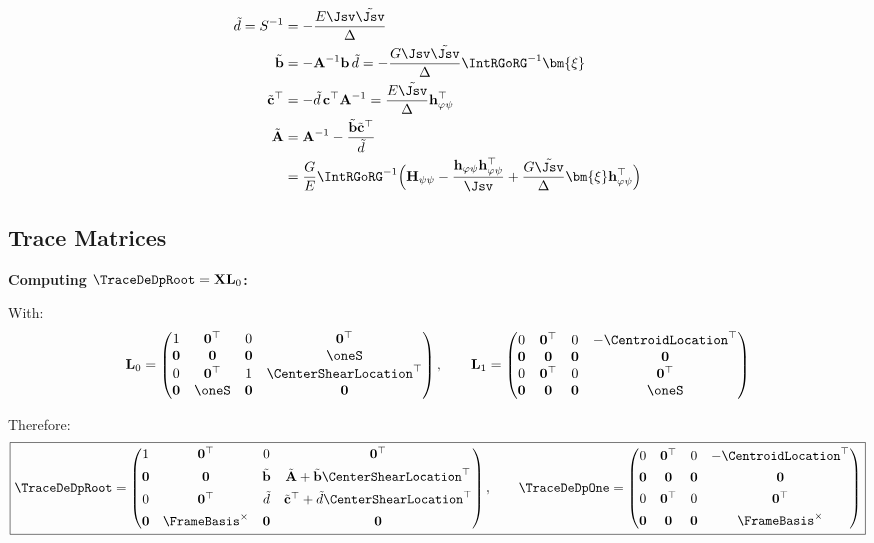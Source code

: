 \[
\begin{aligned}
\tilde{d} = S^{-1} &= -\frac{E\Jsv\tilde{\Jsv}}{\Delta}\\
\tilde{\mathbf{b}} &= -\mathbf{A}^{-1}\mathbf{b}\,\tilde{d} = -\frac{G\Jsv\tilde{\Jsv}}{\Delta}\IntRGoRG^{-1}\bm{\xi} \\
\tilde{\mathbf{c}}^\top &= -\tilde{d}\,\mathbf{c}^\top\mathbf{A}^{-1} = \frac{E\tilde{\Jsv}}{\Delta}\mathbf{h}_{\varphi\psi}^\top \\
\tilde{\mathbf{A}} &= \mathbf{A}^{-1} - \frac{\tilde{\mathbf{b}}\tilde{\mathbf{c}}^\top}{\tilde{d}} \\
&= \frac{G}{E}\IntRGoRG^{-1}\Big(\mathbf{H}_{\psi\psi} - \frac{\mathbf{h}_{\varphi\psi}\mathbf{h}_{\varphi\psi}^\top}{\Jsv} + \frac{G\tilde{\Jsv}}{\Delta}\bm{\xi}\mathbf{h}_{\varphi\psi}^\top\Big)
\end{aligned}
\]

\subsection{Trace Matrices}

\textbf{Computing \(\TraceDeDpRoot = \mathbf{X}\mathbf{L}_0\):}

With: \[\mathbf{L}_0 = \begin{pmatrix}
1 & \mathbf{0}^\top & 0 & \mathbf{0}^\top \\
\mathbf{0} & \mathbf{0} & \mathbf{0} & \oneS \\
0 & \mathbf{0}^\top & 1 & \CenterShearLocation^\top \\
\mathbf{0} & \oneS & \mathbf{0} & \mathbf{0}
\end{pmatrix},
\qquad
\mathbf{L}_1 = \begin{pmatrix}
0 & \mathbf{0}^\top & 0 & -\CentroidLocation^\top \\
\mathbf{0} & \mathbf{0} & \mathbf{0} & \mathbf{0} \\
0 & \mathbf{0}^\top & 0 & \mathbf{0}^\top \\
\mathbf{0} & \mathbf{0} & \mathbf{0} & \oneS
\end{pmatrix}
\]

Therefore: \[
\boxed{
\TraceDeDpRoot = \begin{pmatrix}
1 & \mathbf{0}^\top & 0 & \mathbf{0}^\top \\[4pt]
\mathbf{0} & \mathbf{0} & \tilde{\mathbf{b}} & \tilde{\mathbf{A}} + \tilde{\mathbf{b}}\CenterShearLocation^\top \\[4pt]
0 & \mathbf{0}^\top & \tilde{d} & \tilde{\mathbf{c}}^\top + \tilde{d}\CenterShearLocation^\top \\[4pt]
\mathbf{0} & \FrameBasis^\times & \mathbf{0} & \mathbf{0}
\end{pmatrix},
\qquad
\TraceDeDpOne = \begin{pmatrix}
0 & \mathbf{0}^\top & 0 & -\CentroidLocation^\top \\[4pt]
\mathbf{0} & \mathbf{0} & \mathbf{0} & \mathbf{0} \\[4pt]
0 & \mathbf{0}^\top & 0 & \mathbf{0}^\top \\[4pt]
\mathbf{0} & \mathbf{0} & \mathbf{0} & \FrameBasis^\times
\end{pmatrix}}
\]


